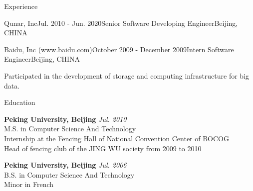 \documentclass{resume} %
\begin{document}
\begin{rSection}{Experience}
\begin{rSubsection}{Qunar, Inc}{Jul. 2010 - Jun. 2020}{Senior Software Developing Engineer}{Beijing, CHINA}
  \end{rSubsection}


  \begin{rSubsection}{Baidu, Inc (www.baidu.com)}{October 2009 - December 2009}{Intern Software Engineer}{Beijing, CHINA}
  \item Participated in the development of storage and computing infrastructure for big data.
  \end{rSubsection}

\end{rSection}



\begin{rSection}{Education}

{\bf Peking University, Beijing} \hfill {\em Jul. 2010} \\ 
M.S. in Computer Science And Technology \\
Internship at the Fencing Hall of National Convention Center of BOCOG \\
Head of fencing club of the JING WU society from 2009 to 2010 

{\bf Peking University, Beijing} \hfill {\em Jul. 2006} \\ 
B.S. in Computer Science And Technology \\
Minor in French

\end{rSection}






\end{document}

